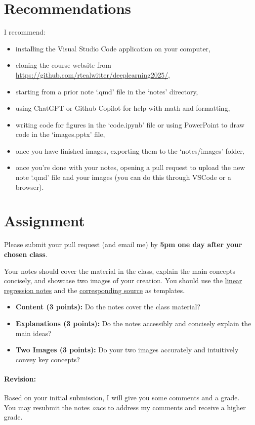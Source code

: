 \documentclass{article}
\begin{document}
\section*{Recommendations}
I recommend:
\begin{itemize}
    \item installing the Visual Studio Code application on your computer,
    \item cloning the course website from \url{https://github.com/rtealwitter/deeplearning2025/},
    \item starting from a prior note `.qmd' file in the `notes' directory,
    \item using ChatGPT or Github Copilot for help with math and formatting,
    \item writing code for figures in the `code.ipynb' file or using PowerPoint to draw code in the `images.pptx' file,
    \item once you have finished images, exporting them to the `notes/images' folder,
    \item once you're done with your notes, opening a pull request to upload the new note `.qmd' file and your images (you can do this through VSCode or a browser).
\end{itemize}

\section*{Assignment}
Please submit your pull request (and email me) by \textbf{5pm one day after your chosen class}.

Your notes should cover the material in the class, explain the main concepts concisely, and showcase two images of your creation. You should use the \href{https://www.rtealwitter.com/deeplearning2025/notes/01_regression.html}{linear regression notes} and the \href{https://github.com/rtealwitter/deeplearning2025/blob/main/notes/01_regression.qmd}{corresponding source} as templates.

\begin{itemize}
    \item \textbf{Content (3 points):} Do the notes cover the class material?
    \item \textbf{Explanations (3 points):} Do the notes accessibly and concisely explain the main ideas?
    \item \textbf{Two Images (3 points):} Do your two images accurately and intuitively convey key concepts? 
\end{itemize}

\paragraph{Revision:} Based on your initial submission, I will give you some comments and a grade. You may resubmit the notes \textit{once} to address my comments and receive a higher grade.
\end{document}
